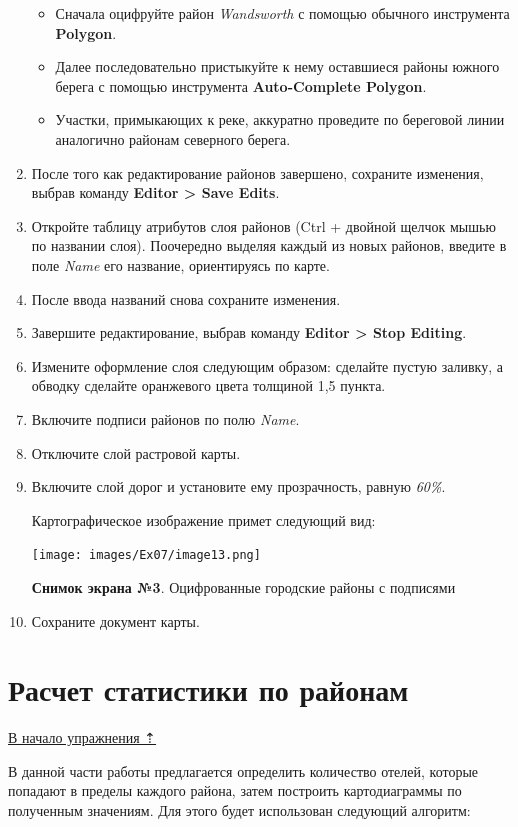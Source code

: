 \documentclass[12pt,]{book}
\begin{document}
\begin{enumerate}
  \begin{itemize}
  \item
    Сначала оцифруйте район \emph{Wandsworth} с помощью обычного инструмента \textbf{Polygon}.
  \item
    Далее последовательно пристыкуйте к нему оставшиеся районы южного берега с помощью инструмента \textbf{Auto-Complete Polygon}.
  \item
    Участки, примыкающих к реке, аккуратно проведите по береговой линии аналогично районам северного берега.
  \end{itemize}
\item
  После того как редактирование районов завершено, сохраните изменения, выбрав команду \textbf{Editor \textgreater{} Save Edits}.
\item
  Откройте таблицу атрибутов слоя районов (Ctrl + двойной щелчок мышью по названии слоя). Поочередно выделяя каждый из новых районов, введите в поле \emph{Name} его название, ориентируясь по карте.
\item
  После ввода названий снова сохраните изменения.
\item
  Завершите редактирование, выбрав команду \textbf{Editor \textgreater{} Stop Editing}.
\item
  Измените оформление слоя следующим образом: сделайте пустую заливку, а обводку сделайте оранжевого цвета толщиной 1,5 пункта.
\item
  Включите подписи районов по полю \emph{Name}.
\item
  Отключите слой растровой карты.
\item
  Включите слой дорог и установите ему прозрачность, равную \emph{60\%}.

  Картографическое изображение примет следующий вид:

  \texttt{[image: images/Ex07/image13.png]}

  \textbf{Снимок экрана №3}. Оцифрованные городские районы с подписями
\item
  Сохраните документ карты.
\end{enumerate}

\hypertarget{map-ref-economic-stats}{%
\section{Расчет статистики по районам}\label{map-ref-economic-stats}}

\protect\hyperlink{map-ref-economic}{В начало упражнения ⇡}

В данной части работы предлагается определить количество отелей, которые попадают в пределы каждого района, затем построить картодиаграммы по полученным значениям. Для этого будет использован следующий алгоритм:
\end{document}
